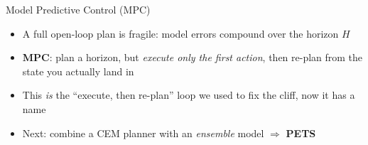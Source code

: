 \begin{frame}{Model Predictive Control (MPC)}
\begin{itemize}
    \item A full open-loop plan is fragile: model errors compound over the
          horizon $H$
    \item \textbf{MPC}: plan a horizon, but \emph{execute only the first action},
          then re-plan from the state you actually land in
    \item This \emph{is} the ``execute, then re-plan'' loop we used to fix the
          cliff, now it has a name
    \item Next: combine a CEM planner with an \emph{ensemble} model
          $\Rightarrow$ \textbf{PETS}
\end{itemize}
\end{frame}
